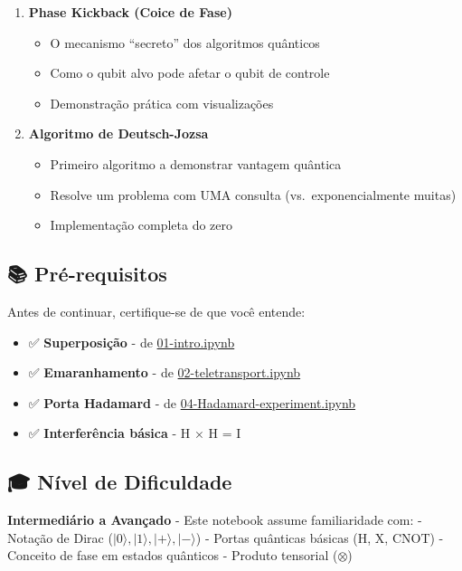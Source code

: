 \documentclass[
  brazilian,
]{report}
\providecommand{\tightlist}{%
  \setlength{\itemsep}{0pt}\setlength{\parskip}{0pt}}
\begin{document}
\begin{enumerate}
\def\labelenumi{\arabic{enumi}.}
\tightlist
\item
  \textbf{Phase Kickback (Coice de Fase)}

  \begin{itemize}
  \tightlist
  \item
    O mecanismo ``secreto'' dos algoritmos quânticos
  \item
    Como o qubit alvo pode afetar o qubit de controle
  \item
    Demonstração prática com visualizações
  \end{itemize}
\item
  \textbf{Algoritmo de Deutsch-Jozsa}

  \begin{itemize}
  \tightlist
  \item
    Primeiro algoritmo a demonstrar vantagem quântica
  \item
    Resolve um problema com UMA consulta (vs.~exponencialmente muitas)
  \item
    Implementação completa do zero
  \end{itemize}
\end{enumerate}

\subsection{📚 Pré-requisitos}\label{pruxe9-requisitos}

Antes de continuar, certifique-se de que você entende:

\begin{itemize}
\tightlist
\item
  ✅ \textbf{Superposição} - de \url{01-intro.ipynb}
\item
  ✅ \textbf{Emaranhamento} - de \url{02-teletransport.ipynb}
\item
  ✅ \textbf{Porta Hadamard} - de \url{04-Hadamard-experiment.ipynb}
\item
  ✅ \textbf{Interferência básica} - H × H = I
\end{itemize}

\subsection{🎓 Nível de Dificuldade}\label{nuxedvel-de-dificuldade}

\textbf{Intermediário a Avançado} - Este notebook assume familiaridade
com: - Notação de Dirac (\(|0\rangle, |1\rangle, |+\rangle, |-\rangle\))
- Portas quânticas básicas (H, X, CNOT) - Conceito de fase em estados
quânticos - Produto tensorial (\(\otimes\))
\end{document}
